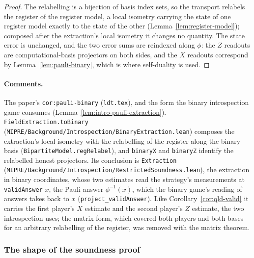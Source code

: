\begin{proof}
\leanok
The relabelling is a bijection of basis index sets, so the transport relabels the register of the
register model, a local isometry carrying the state of one register model exactly to the state of
the other (Lemma~\ref{lem:register-model}); composed after the extraction's local isometry it
changes no quantity. The state error is unchanged, and the two error sums are reindexed along
$\phi$: the $Z$ readouts are computational-basis projectors on both sides, and the $X$ readouts
correspond by Lemma~\ref{lem:pauli-binary}, which is where self-duality is used.
\end{proof}

\paragraph{Comments.} The paper's \texttt{cor:pauli-binary} (\texttt{ldt.tex}), and the form the
binary introspection game consumes (Lemma~\ref{lem:intro-pauli-extraction}).
\texttt{FieldExtraction.toBinary} (\texttt{MIPRE/Background/Introspection/BinaryExtraction.lean})
composes the extraction's local isometry with the relabelling of the register along the binary basis
(\texttt{BipartiteModel.regRelabel}), and \texttt{binaryX} and \texttt{binaryZ} identify the
relabelled honest projectors. Its conclusion is \texttt{Extraction}
(\texttt{MIPRE/Background/Introspection/RestrictedSoundness.lean}), the extraction in binary
coordinates, whose two estimates read the strategy's measurements at \texttt{validAnswer} $x$, the
Pauli answer $\phi^{-1}(x)$, which the binary game's reading of answers takes back to $x$
(\texttt{project\_validAnswer}). Like Corollary~\ref{cor:qld-valid} it carries the first player's
$X$ estimate and the second player's $Z$ estimate, the two introspection uses; the matrix form,
which covered both players and both bases for an arbitrary relabelling of the register, was removed
with the matrix theorem.

\subsubsection{The shape of the soundness proof}

